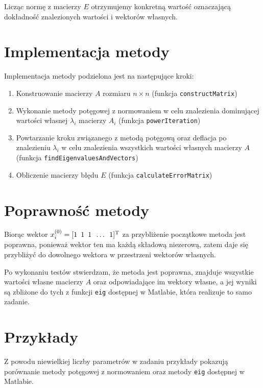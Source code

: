 \documentclass[12pt]{article}
\begin{document}
	Licząc normę z macierzy $E$ otrzymujemy konkretną wartość oznaczającą dokładność znalezionych wartości i wektorów własnych.
	
	\section{Implementacja metody}
	Implementacja metody podzielona jest na następujące kroki:
	\begin{enumerate}
		\item Konstruowanie macierzy $A$ rozmiaru $n \times n$ (funkcja \texttt{constructMatrix})
		\item Wykonanie metody potęgowej z normowaniem w celu znalezienia dominującej wartości własnej $\lambda_i$ macierzy $A_i$ (funkcja \texttt{powerIteration})
		\item Powtarzanie kroku związanego z metodą potęgową oraz deflacja po znalezieniu $\lambda_i$ w celu znalezienia wszystkich wartości własnych macierzy $A$ (funkcja \texttt{findEigenvaluesAndVectors})
		\item Obliczenie macierzy błędu $E$ (funkcja \texttt{calculateErrorMatrix})
	\end{enumerate}

	
	
	\section{Poprawność metody}
	Biorąc wektor $x_i^{(0)} = [1 \hspace{5px} 1 \hspace{5px} 1 \hspace{5px} \dots \hspace{5px} 1]^\text{T}$ za przybliżenie początkowe metoda jest poprawna, ponieważ wektor ten ma każdą składową niezerową, zatem daje się przybliżyć do dowolnego wektora w przestrzeni wektorów własnych.
	
	Po wykonaniu testów stwierdzam, że metoda jest poprawna, znajduje wszystkie wartości własne macierzy $A$ oraz odpowiadające im wektory własne, a jej wyniki są zbliżone do tych z funkcji \texttt{eig} dostępnej w Matlabie, która realizuje to samo zadanie.
	
	
	
	\section{Przykłady}
	Z powodu niewielkiej liczby parametrów w zadaniu przykłady pokazują porównanie metody potęgowej z normowaniem oraz metody \texttt{eig} dostępnej w Matlabie.
	
\end{document}
